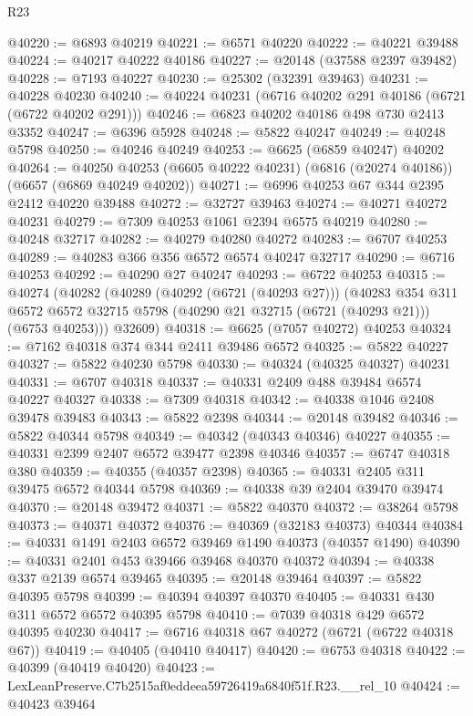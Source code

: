 \begin{lexlean}{R23}
\begin{coremodule}
@40220 := @6893 @40219
@40221 := @6571 @40220
@40222 := @40221 @39488
@40224 := @40217 @40222 @40186
@40227 := @20148 (@37588 @2397 @39482)
@40228 := @7193 @40227
@40230 := @25302 (@32391 @39463)
@40231 := @40228 @40230
@40240 := @40224 @40231 (@6716 @40202 @291 @40186 (@6721 (@6722 @40202 @291)))
@40246 := @6823 @40202 @40186 @498 @730 @2413 @3352
@40247 := @6396 @5928
@40248 := @5822 @40247
@40249 := @40248 @5798
@40250 := @40246 @40249
@40253 := @6625 (@6859 @40247) @40202
@40264 := @40250 @40253 (@6605 @40222 @40231) (@6816 (@20274 @40186)) (@6657 (@6869 @40249 @40202))
@40271 := @6996 @40253 @67 @344 @2395 @2412 @40220 @39488
@40272 := @32727 @39463
@40274 := @40271 @40272 @40231
@40279 := @7309 @40253 @1061 @2394 @6575 @40219
@40280 := @40248 @32717
@40282 := @40279 @40280 @40272
@40283 := @6707 @40253
@40289 := @40283 @366 @356 @6572 @6574 @40247 @32717
@40290 := @6716 @40253
@40292 := @40290 @27 @40247
@40293 := @6722 @40253
@40315 := @40274
    (@40282
      (@40289
        (@40292 (@6721 (@40293 @27)))
        (@40283
          @354
          @311
          @6572
          @6572
          @32715
          @5798
          (@40290 @21 @32715 (@6721 (@40293 @21)))
          (@6753 @40253)))
      @32609)
@40318 := @6625 (@7057 @40272) @40253
@40324 := @7162 @40318 @374 @344 @2411 @39486 @6572
@40325 := @5822 @40227
@40327 := @5822 @40230 @5798
@40330 := @40324 (@40325 @40327) @40231
@40331 := @6707 @40318
@40337 := @40331 @2409 @488 @39484 @6574 @40227 @40327
@40338 := @7309 @40318
@40342 := @40338 @1046 @2408 @39478 @39483
@40343 := @5822 @2398
@40344 := @20148 @39482
@40346 := @5822 @40344 @5798
@40349 := @40342 (@40343 @40346) @40227
@40355 := @40331 @2399 @2407 @6572 @39477 @2398 @40346
@40357 := @6747 @40318 @380
@40359 := @40355 (@40357 @2398)
@40365 := @40331 @2405 @311 @39475 @6572 @40344 @5798
@40369 := @40338 @39 @2404 @39470 @39474
@40370 := @20148 @39472
@40371 := @5822 @40370
@40372 := @38264 @5798
@40373 := @40371 @40372
@40376 := @40369 (@32183 @40373) @40344
@40384 := @40331 @1491 @2403 @6572 @39469 @1490 @40373 (@40357 @1490)
@40390 := @40331 @2401 @453 @39466 @39468 @40370 @40372
@40394 := @40338 @337 @2139 @6574 @39465
@40395 := @20148 @39464
@40397 := @5822 @40395 @5798
@40399 := @40394 @40397 @40370
@40405 := @40331 @430 @311 @6572 @6572 @40395 @5798
@40410 := @7039 @40318 @429 @6572 @40395 @40230
@40417 := @6716 @40318 @67 @40272 (@6721 (@6722 @40318 @67))
@40419 := @40405 (@40410 @40417)
@40420 := @6753 @40318
@40422 := @40399 (@40419 @40420)
@40423 := LexLeanPreserve.C7b2515af0eddeea59726419a6840f51f.R23.__rel_10
@40424 := @40423 @39464

\end{coremodule}
\end{lexlean}
